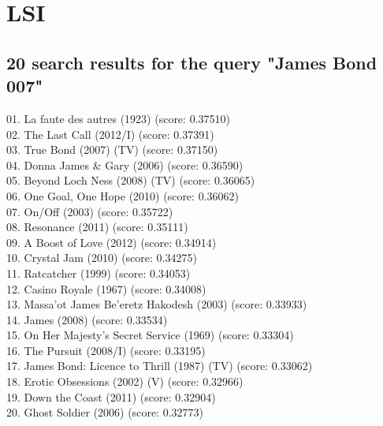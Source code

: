 \documentclass[11pt]{article} %
\begin{document}
\section{LSI}
\subsection{20 search results for the query "James Bond 007"}
\tiny
01. La faute des autres (1923) (score: 0.37510)\\
02. The Last Call (2012/I) (score: 0.37391)\\
03. True Bond (2007) (TV) (score: 0.37150)\\
04. Donna James \& Gary (2006) (score: 0.36590)\\
05. Beyond Loch Ness (2008) (TV) (score: 0.36065)\\
06. One Goal, One Hope (2010) (score: 0.36062)\\
07. On/Off (2003) (score: 0.35722)\\
08. Resonance (2011) (score: 0.35111)\\
09. A Boost of Love (2012) (score: 0.34914)\\
10. Crystal Jam (2010) (score: 0.34275)\\
11. Ratcatcher (1999) (score: 0.34053)\\
12. Casino Royale (1967) (score: 0.34008)\\
13. Massa'ot James Be'eretz Hakodesh (2003) (score: 0.33933)\\
14. James (2008) (score: 0.33534)\\
15. On Her Majesty's Secret Service (1969) (score: 0.33304)\\
16. The Pursuit (2008/I) (score: 0.33195)\\
17. James Bond: Licence to Thrill (1987) (TV) (score: 0.33062)\\
18. Erotic Obsessions (2002) (V) (score: 0.32966)\\
19. Down the Coast (2011) (score: 0.32904)\\
20. Ghost Soldier (2006) (score: 0.32773)\\
\normalsize
\end{document}
